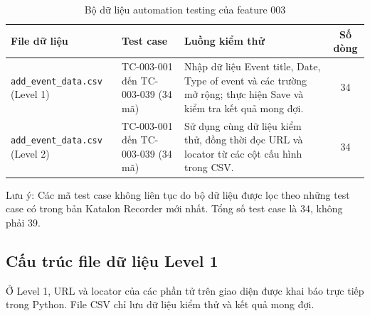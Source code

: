 \documentclass[12pt,a4paper]{article}
\begin{document}
\begin{table}[H]
\centering\small
\begin{tabular}{|L{3.5cm}|L{3.3cm}|L{6.0cm}|c|}
\hline
{}
\textbf{File dữ liệu} & \textbf{Test case} & \textbf{Luồng kiểm thử} & \textbf{Số dòng} \\ \hline

\texttt{add\_event\_data.csv} (Level 1)
& TC-003-001 đến TC-003-039 (34 mã)
& Nhập dữ liệu Event title, Date, Type of event và các trường mở rộng; thực hiện Save và kiểm tra kết quả mong đợi.
& 34 \\ \hline

\texttt{add\_event\_data.csv} (Level 2)
& TC-003-001 đến TC-003-039 (34 mã)
& Sử dụng cùng dữ liệu kiểm thử, đồng thời đọc URL và locator từ các cột cấu hình trong CSV.
& 34 \\ \hline
\end{tabular}
\caption{Bộ dữ liệu automation testing của feature 003}
\end{table}

Lưu ý: Các mã test case không liên tục do bộ dữ liệu được lọc theo những test case có trong bản Katalon Recorder mới nhất. Tổng số test case là 34, không phải 39.

\subsection{Cấu trúc file dữ liệu Level 1}

Ở Level 1, URL và locator của các phần tử trên giao diện được khai báo trực tiếp trong Python. File CSV chỉ lưu dữ liệu kiểm thử và kết quả mong đợi.
\end{document}
